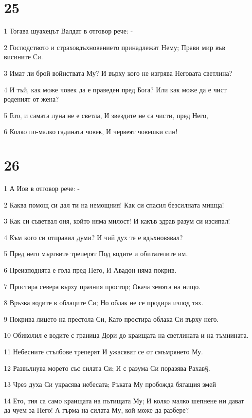 \chapter{25}

\par 1 Тогава шуахецът Валдат в отговор рече: -
\par 2 Господството и страховдъхновението принадлежат Нему; Прави мир във висините Си.
\par 3 Имат ли брой войнствата Му? И върху кого не изгрява Неговата светлина?
\par 4 И тъй, как може човек да е праведен пред Бога? Или как може да е чист роденият от жена?
\par 5 Ето, и самата луна не е светла, И звездите не са чисти, пред Него,
\par 6 Колко по-малко гадината човек, И червеят човешки син!

\chapter{26}

\par 1 А Иов в отговор рече: -
\par 2 Каква помощ си дал ти на немощния! Как си спасил безсилната мишца!
\par 3 Как си съветвал оня, който няма милост! И какъв здрав разум си изсипал!
\par 4 Към кого си отправил думи? И чий дух те е вдъхновявал?
\par 5 Пред него мъртвите треперят Под водите и обитателите им.
\par 6 Преизподнята е гола пред Него, И Авадон няма покрив.
\par 7 Простира севера върху празния простор; Окача земята на нищо.
\par 8 Връзва водите в облаците Си; Но облак не се продира изпод тях.
\par 9 Покрива лицето на престола Си, Като простира облака Си върху него.
\par 10 Обиколил е водите с граница Дори до краищата на светлината и на тъмнината.
\par 11 Небесните стълбове треперят И ужасяват се от смъмрянето Му.
\par 12 Развълнува морето със силата Си; И с разума Си поразява Рахав§.
\par 13 Чрез духа Си украсява небесата; Ръката Му пробожда бягащия змей
\par 14 Ето, тия са само краищата на пътищата Му; И колко малко шепнене ни дават да чуем за Него! А гърма на силата Му, кой може да разбере?

